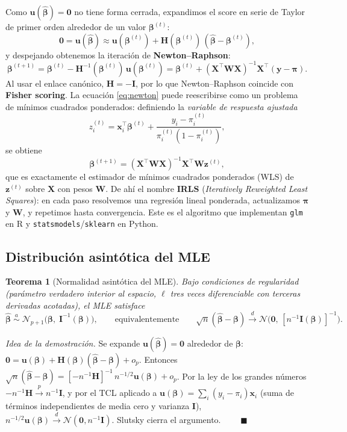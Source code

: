 \documentclass[11pt]{article}
\theoremstyle{plain}
\newtheorem{teorema}{Teorema}[section]
\theoremstyle{definition}
\theoremstyle{remark}
\newcommand{\bbeta}{\bm{\beta}}
\newcommand{\bx}{\bm{x}}
\newcommand{\bX}{\bm{X}}
\newcommand{\by}{\bm{y}}
\newcommand{\bu}{\bm{u}}
\newcommand{\bW}{\bm{W}}
\newcommand{\bI}{\bm{I}}
\newcommand{\bH}{\bm{H}}
\newcommand{\bpi}{\bm{\pi}}
\newcommand{\hbeta}{\hat{\bm{\beta}}}
\newcommand{\convd}{\xrightarrow{d}}
\newcommand{\convp}{\xrightarrow{p}}
\newcommand{\Nor}{\mathcal{N}}
\begin{document}
Como $\bu(\hbeta)=\bm 0$ no tiene forma cerrada, expandimos el score en serie
de Taylor de primer orden alrededor de un valor $\bbeta^{(t)}$:
\[
  \bm 0 = \bu(\hbeta) \approx \bu(\bbeta^{(t)})
  + \bH(\bbeta^{(t)})\,(\hbeta - \bbeta^{(t)}),
\]
y despejando obtenemos la iteración de \textbf{Newton--Raphson}:
\begin{equation}
  \bbeta^{(t+1)}
  = \bbeta^{(t)} - \bH^{-1}(\bbeta^{(t)})\,\bu(\bbeta^{(t)})
  = \bbeta^{(t)} + (\bX^\top\bW\bX)^{-1}\bX^\top(\by-\bpi).
  \label{eq:newton}
\end{equation}
Al usar el enlace canónico, $\bH=-\bI$, por lo que Newton--Raphson coincide con
\textbf{Fisher scoring}. La ecuación \eqref{eq:newton} puede reescribirse como
un problema de mínimos cuadrados ponderados: definiendo la
\emph{variable de respuesta ajustada}
\[
  z_i^{(t)} = \bx_i^\top\bbeta^{(t)}
  + \frac{y_i - \pi_i^{(t)}}{\pi_i^{(t)}(1-\pi_i^{(t)})},
\]
se obtiene
\[
  \bbeta^{(t+1)} = (\bX^\top\bW\bX)^{-1}\bX^\top\bW\bm z^{(t)},
\]
que es exactamente el estimador de mínimos cuadrados ponderados (WLS) de
$\bm z^{(t)}$ sobre $\bX$ con pesos $\bW$. De ahí el nombre \textbf{IRLS}
(\emph{Iteratively Reweighted Least Squares}): en cada paso resolvemos una
regresión lineal ponderada, actualizamos $\bpi$ y $\bW$, y repetimos hasta
convergencia. Este es el algoritmo que implementan \texttt{glm} en R y
\texttt{statsmodels}/\texttt{sklearn} en Python.

\subsection{Distribución asintótica del MLE}

\begin{teorema}[Normalidad asintótica del MLE]\label{thm:asymp}
Bajo condiciones de regularidad (parámetro verdadero interior al espacio,
$\ell$ tres veces diferenciable con terceras derivadas acotadas), el MLE
satisface
\[
  \hbeta \;\overset{a}{\sim}\; \Nor_{p+1}\!\big(\bbeta,\; \bI^{-1}(\bbeta)\big),
  \qquad\text{equivalentemente}\qquad
  \sqrt{n}(\hbeta-\bbeta)\convd \Nor\!\big(\bm 0,\, [n^{-1}\bI(\bbeta)]^{-1}\big).
\]
\end{teorema}

\emph{Idea de la demostración.} Se expande $\bu(\hbeta)=\bm 0$ alrededor de
$\bbeta$: $\bm0 = \bu(\bbeta) + \bH(\bbeta)(\hbeta-\bbeta) + o_p$. Entonces
$\sqrt n(\hbeta-\bbeta) = [-n^{-1}\bH]^{-1}\, n^{-1/2}\bu(\bbeta)+o_p$. Por la
ley de los grandes números $-n^{-1}\bH \convp n^{-1}\bI$, y por el TCL aplicado
a $\bu(\bbeta)=\sum_i(y_i-\pi_i)\bx_i$ (suma de términos independientes de media
cero y varianza $\bI$), $n^{-1/2}\bu(\bbeta)\convd\Nor(\bm0, n^{-1}\bI)$.
Slutsky cierra el argumento. $\qquad\blacksquare$
\end{document}
